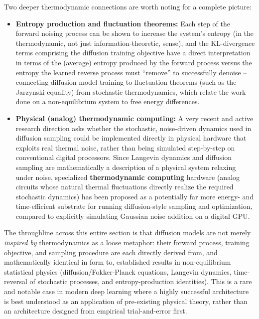 \documentclass[12pt,a4paper]{article}
\begin{document}
Two deeper thermodynamic connections are worth noting for a complete picture:

\begin{itemize}[leftmargin=1.5em]
    \item \textbf{Entropy production and fluctuation theorems:} Each step of the forward noising process can be shown to increase the system's entropy (in the thermodynamic, not just information-theoretic, sense), and the KL-divergence terms comprising the diffusion training objective have a direct interpretation in terms of the (average) entropy produced by the forward process versus the entropy the learned reverse process must ``remove'' to successfully denoise -- connecting diffusion model training to fluctuation theorems (such as the Jarzynski equality) from stochastic thermodynamics, which relate the work done on a non-equilibrium system to free energy differences.
    \item \textbf{Physical (analog) thermodynamic computing:} A very recent and active research direction asks whether the stochastic, noise-driven dynamics used in diffusion sampling could be implemented directly in physical hardware that exploits real thermal noise, rather than being simulated step-by-step on conventional digital processors. Since Langevin dynamics and diffusion sampling are mathematically a description of a physical system relaxing under noise, specialized \textbf{thermodynamic computing} hardware (analog circuits whose natural thermal fluctuations directly realize the required stochastic dynamics) has been proposed as a potentially far more energy- and time-efficient substrate for running diffusion-style sampling and optimization, compared to explicitly simulating Gaussian noise addition on a digital GPU.
\end{itemize}

\begin{keyidea}
The throughline across this entire section is that diffusion models are not merely \emph{inspired by} thermodynamics as a loose metaphor: their forward process, training objective, and sampling procedure are each directly derived from, and mathematically identical in form to, established results in non-equilibrium statistical physics (diffusion/Fokker-Planck equations, Langevin dynamics, time-reversal of stochastic processes, and entropy-production identities). This is a rare and notable case in modern deep learning where a highly successful architecture is best understood as an application of pre-existing physical theory, rather than an architecture designed from empirical trial-and-error first.
\end{keyidea}
\end{document}
